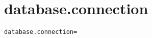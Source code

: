 \section{database.connection}
\label{configuration:DatabaseConnection}
\AvailableInJavaOnly{\TODO}
\begin{lstlisting}[style=Props,caption={Usage example for \textit{database.connection}}]
database.connection=
\end{lstlisting}